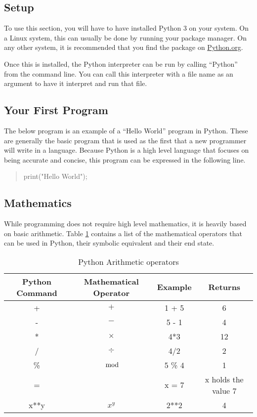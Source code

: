 		\subsection{Setup}
			To use this section, you will have to have installed Python 3 on your system. 
			On a Linux system, this can usually be done by running your package manager. 
			On any other system, it is recommended that you find the package on \url{Python.org}.

			Once this is installed, the Python interpreter can be run by calling ``Python'' from the command line. 
			You can call this interpreter with a file name as an argument to have it interpret and run that file. 

		\subsection{Your First Program}
			The below program is an example of a ``Hello World'' program in Python. 
			These are generally the basic program that is used as the first that a new programmer will write in a language. 
			Because Python is a high level language that focuses on being accurate and concise, this program can be expressed in the following line. 
			\begin{quote}
				print("Hello World");
			\end{quote}

		\subsection{Mathematics}
			While programming does not require high level mathematics, it is heavily based on basic arithmetic. 
			Table \ref{tab:PythonMaths} contains a list of the mathematical operators that can be used in Python, their symbolic equivalent and their end state. 
			\begin{table}[htb]
				\centering
				\begin{adjustbox}{max width=1\textwidth}
				\begin{tabular}{|c|c|c|c|}
					\hline
					\textbf{Python Command} & \textbf{Mathematical Operator} & \textbf{Example} & \textbf{Returns} \\ \hline
					+ & $+$ & 1 + 5 & 6 \\ \hline
					- & $-$ & 5 - 1 & 4 \\ \hline
					* & $\times$ & 4*3 & 12 \\ \hline
					/ & $\div$ & 4/2 & 2 \\ \hline
					\% & $\mod$ & 5 \% 4 & 1 \\ \hline 
					= &  & x = 7 & x holds the value 7 \\ \hline 
					x**y & $x^y$ & 2**2 & 4 \\ \hline
				\end{tabular}
				\end{adjustbox}
				\caption{Python Arithmetic operators}
				\label{tab:PythonMaths}
			\end{table}
